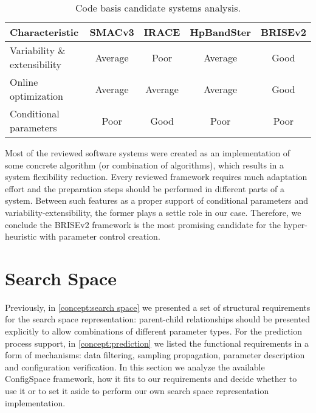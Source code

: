 \begin{table}[h!]
	\centering
	\begin{tabular}{l|cccc}
		\hline
		\rowcolor{gray!10}
		\textbf{Characteristic} & \textbf{SMACv3}& \textbf{IRACE} & \textbf{HpBandSter} & \textbf{BRISEv2} \\
		\hline
		Variability \& extensibility & \cellcolor{yellow!25}Average & \cellcolor{red!25}Poor & \cellcolor{yellow!25}Average & \cellcolor{green!25}Good \\
	
		Online optimization & \cellcolor{yellow!25}Average & \cellcolor{yellow!25}Average & \cellcolor{yellow!25}Average & \cellcolor{green!25}Good \\
	
		Conditional parameters & \cellcolor{red!25}Poor & \cellcolor{green!25}Good & \cellcolor{red!25}Poor & \cellcolor{red!25}Poor \\
		\hline
	\end{tabular}
	\caption{Code basis candidate systems analysis.}
	\label{iml: table code basis selection}
\end{table}

Most of the reviewed software systems were created as an implementation of some concrete algorithm (or combination of algorithms), which results in a system flexibility reduction. Every reviewed framework requires much adaptation effort and the preparation steps should be performed in different parts of a system. Between such features as a proper support of conditional parameters and variability-extensibility, the former plays a settle role in our case. Therefore, we conclude the BRISEv2 framework is the most promising candidate for the hyper-heuristic with parameter control creation.

\section{Search Space}\label{impl: search space}
Previously, in \cref{concept:search space} we presented a set of structural requirements for the search space representation: parent-child relationships should be presented explicitly to allow combinations of different parameter types. For the prediction process support, in \cref{concept:prediction} we listed the functional requirements in a form of mechanisms: data filtering, sampling propagation, parameter description and configuration verification. In this section we analyze the available ConfigSpace framework, how it fits to our requirements and decide whether to use it or to set it aside to perform our own search space representation implementation.

